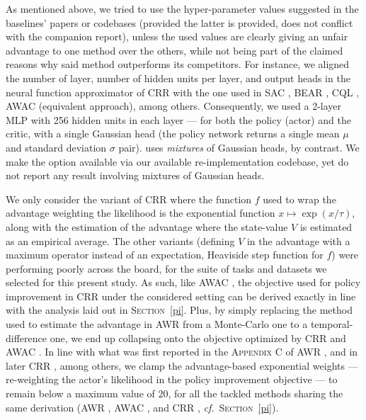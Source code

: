 As mentioned above, we tried to use the hyper-parameter values suggested in the baselines' papers or codebases (provided
the latter is provided, does not conflict with the companion report), unless the used values are clearly
giving an unfair advantage to one method over the others, while not being part of the claimed reasons
why said method outperforms its competitors. For instance, we aligned the number of layer,
number of hidden units per layer,
and output heads in the neural function approximator of CRR \cite{Wang2020-sr}
with the one used in SAC \cite{Haarnoja2018-bm},
BEAR \cite{Kumar2019-rw},
CQL \cite{Kumar2020-zb},
AWAC \cite{Nair2020-gd} (equivalent approach), among others.
Consequently, we used a 2-layer MLP with 256 hidden units in each layer --- for both the policy (actor) and the critic,
with a single Gaussian head (the policy network returns a single mean $\mu$ and standard deviation $\sigma$ pair).
\cite{Wang2020-sr} uses \emph{mixtures} of Gaussian heads, by contrast.
We make the option available via our available re-implementation codebase,
yet do not report any result involving mixtures of Gaussian heads.

We only consider the variant of CRR \cite{Wang2020-sr}
where the function $f$ used to wrap the advantage weighting the likelihood is the exponential function
$x \mapsto \exp(x / \tau)$,
along with the estimation of the advantage where the state-value $V$ is estimated as an empirical average.
The other variants (defining $V$ in the advantage with a maximum operator instead of an expectation,
Heaviside step function for $f$)
were performing poorly across the board, for the suite of tasks and datasets
we selected for this present study.
As such, like AWAC \cite{Nair2020-gd},
the objective used for policy improvement in CRR \cite{Wang2020-sr}
under the considered setting
can be derived exactly in line with the analysis laid out in \textsc{Section}~\ref{pi}.
Plus, by simply replacing the method used to estimate the advantage in AWR \cite{Peng2019-hu}
from a Monte-Carlo one to a temporal-difference one, we end up collapsing onto the objective optimized by
CRR \cite{Wang2020-sr}
and AWAC \cite{Nair2020-gd}.
In line with what was first reported in the \textsc{Appendix} C of AWR \cite{Peng2019-hu},
and in later CRR \cite{Wang2020-sr},
among others,
we clamp the advantage-based exponential weights
--- re-weighting the actor's likelihood in the policy improvement objective
--- to remain below a maximum value of $20$,
for all the tackled methods sharing the same derivation
(AWR \cite{Peng2019-hu},
AWAC \cite{Nair2020-gd},
and CRR \cite{Wang2020-sr},
\textit{cf.}~\textsc{Section}~\ref{pi}).

